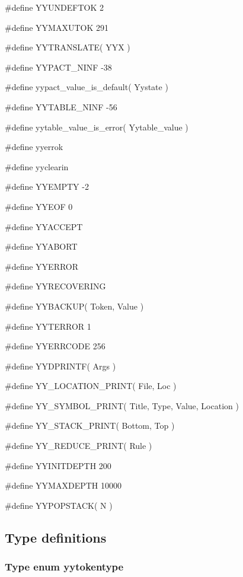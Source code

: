 \medskip
{\stt \#define YYUNDEFTOK 2}

\medskip
{\stt \#define YYMAXUTOK 291}

\medskip
{\stt \#define YYTRANSLATE( YYX )}

\medskip
{\stt \#define YYPACT\_NINF -38}

\medskip
{\stt \#define yypact\_value\_is\_default( Yystate )}

\medskip
{\stt \#define YYTABLE\_NINF -56}

\medskip
{\stt \#define yytable\_value\_is\_error( Yytable\_value )}

\medskip
{\stt \#define yyerrok}

\medskip
{\stt \#define yyclearin}

\medskip
{\stt \#define YYEMPTY -2}

\medskip
{\stt \#define YYEOF 0}

\medskip
{\stt \#define YYACCEPT}

\medskip
{\stt \#define YYABORT}

\medskip
{\stt \#define YYERROR}

\medskip
{\stt \#define YYRECOVERING}

\medskip
{\stt \#define YYBACKUP( Token, Value )}

\medskip
{\stt \#define YYTERROR 1}

\medskip
{\stt \#define YYERRCODE 256}

\medskip
{\stt \#define YYDPRINTF( Args )}

\medskip
{\stt \#define YY\_LOCATION\_PRINT( File, Loc )}

\medskip
{\stt \#define YY\_SYMBOL\_PRINT( Title, Type, Value, Location )}

\medskip
{\stt \#define YY\_STACK\_PRINT( Bottom, Top )}

\medskip
{\stt \#define YY\_REDUCE\_PRINT( Rule )}

\medskip
{\stt \#define YYINITDEPTH 200}

\medskip
{\stt \#define YYMAXDEPTH 10000}

\medskip
{\stt \#define YYPOPSTACK( N )}


\subsection{Type definitions}


\subsubsection{Type enum yytokentype}
\label{type_enum_yytokentype_p-exp.c}

